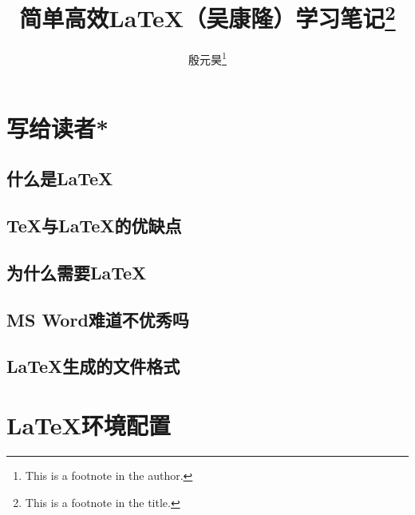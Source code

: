 \documentclass[twoside]{ctexart}
\title{简单高效\LaTeX（吴康隆）学习笔记\thanks{This is a footnote in the title.}}
\author{殷元昊\thanks{This is a footnote in the author.}}
\date{}
\begin{document}
\maketitle

\renewcommand{\contentsname}{这是目录}
\tableofcontents

\renewcommand{\listfigurename}{这是插图目录}
\listoffigures

\renewcommand{\listtablename}{这是表格目录}
\listoftables

\section{写给读者*}
    \subsection{什么是\LaTeX}
    \subsection{\TeX 与\LaTeX 的优缺点}
    \subsection{为什么需要\LaTeX}
    \subsection{MS Word难道不优秀吗}
    \subsection{\LaTeX 生成的文件格式}

\section{\LaTeX 环境配置}
\end{document}
